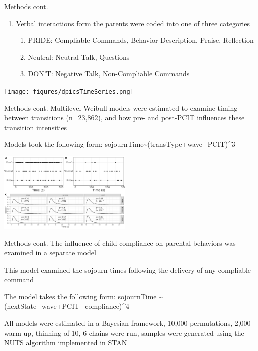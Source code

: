 \documentclass[
  ignorenonframetext,
]{beamer}
\providecommand{\tightlist}{%
  \setlength{\itemsep}{0pt}\setlength{\parskip}{0pt}}
\begin{document}
\begin{frame}{Methods cont.}
\label{methods-cont.}
\begin{enumerate}
\tightlist
\item
  Verbal interactions form the parents were coded into one of three
  categories

  \begin{enumerate}
  \tightlist
  \item
    PRIDE: Compliable Commands, Behavior Description, Praise, Reflection
  \item
    Neutral: Neutral Talk, Questions
  \item
    DON'T: Negative Talk, Non-Compliable Commands
  \end{enumerate}
\end{enumerate}

\texttt{[image: figures/dpicsTimeSeries.png]}
\end{frame}

\begin{frame}{Methods cont.}
\label{methods-cont.-1}
Multilevel Weibull models were estimated to examine timing between
transitions (n=23,862), and how pre- and post-PCIT influences these
transition intensities

Models took the following form:
sojournTime\textasciitilde(transType+wave+PCIT)\^{}3

\includegraphics[width=2.5in,height=\textheight]{figures/CLUPTimeSeries.png}
\end{frame}

\begin{frame}{Methods cont.}
\label{methods-cont.-2}
The influence of child compliance on parental behaviors was examined in
a separate model

This model examined the sojourn times following the delivery of any
compliable command

The model takes the following form: sojournTime \textasciitilde{}
(nextState+wave+PCIT+compliance)\^{}4

All models were estimated in a Bayesian framework, 10,000 permutations,
2,000 warm-up, thinning of 10, 6 chains were run, samples were generated
using the NUTS algorithm implemented in STAN
\end{frame}
\end{document}
